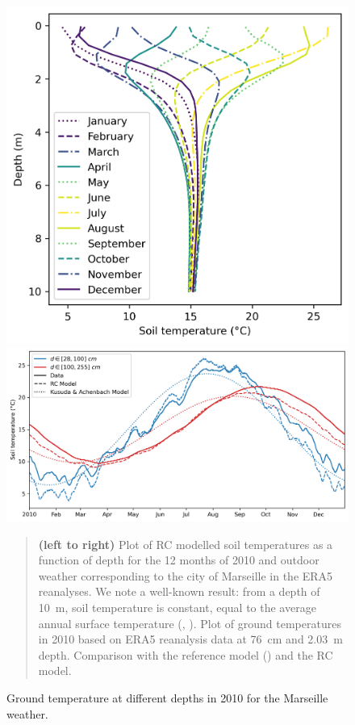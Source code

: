 \documentclass[11pt]{article}
\begin{document}
            \begin{figure}[ht]
                \centering
                
                \includegraphics[width=0.335\columnwidth]{figures/modelling_of_ground_temperature_months_Marseille_2010.png}
                \includegraphics[width=0.655\columnwidth]{figures/timeserie_ground_temperature_Marseille_2010.png}
                
                \caption{\label{fig:ground_temperature} Ground temperature at different depths in 2010 for the Marseille weather.}
                    \begin{quote}
                        \vspace{-2mm}
                        \small\noindent
                        \textbf{(left to right)} Plot of RC modelled soil temperatures as a function of depth for the 12 months of 2010 and outdoor weather corresponding to the city of Marseille in the ERA5 reanalyses. We note a well-known result: from a depth of \SI{10}{\meter}, soil temperature is constant, equal to the average annual surface temperature (\cite{badache_new_2016}, \cite{al-hinti_measurement_2017}). Plot of ground temperatures in 2010 based on ERA5 reanalysis data at \SI{76}{\centi\meter} and \SI{2.03}{\meter} depth. Comparison with the reference model (\cite{kusuda_earth_1965}) and the RC model.
                    \end{quote}
                \end{figure}
        
\end{document}
